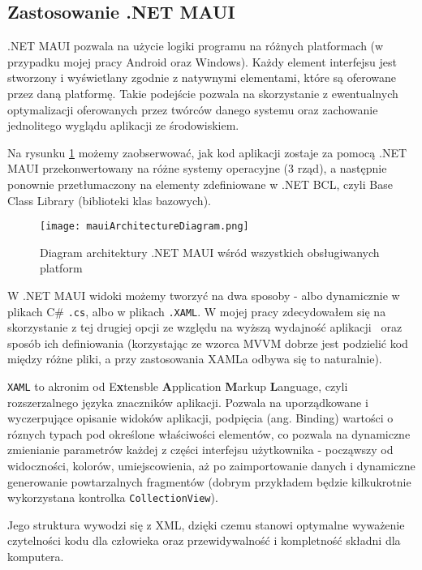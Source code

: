 \subsection{Zastosowanie .NET MAUI}

.NET MAUI pozwala na użycie logiki programu na różnych platformach 
(w przypadku mojej pracy Android oraz Windows).
Każdy element interfejsu jest stworzony i wyświetlany zgodnie z natywnymi elementami, 
które są oferowane przez daną platformę. Takie podejście pozwala na skorzystanie 
z ewentualnych optymalizacji oferowanych przez twórców danego systemu oraz 
zachowanie jednolitego wyglądu aplikacji ze środowiskiem.

Na rysunku \ref{img:mauiArchitectureDiagram} możemy zaobserwować, jak kod aplikacji 
zostaje za pomocą .NET MAUI przekonwertowany na różne systemy operacyjne (3 rząd), 
a następnie ponownie przetłumaczony na elementy zdefiniowane w .NET BCL, 
czyli Base Class Library (biblioteki klas bazowych). \\%
\begin{figure}[ht]
    \centering
    \texttt{[image: mauiArchitectureDiagram.png]}
    \caption{Diagram architektury .NET MAUI wśród wszystkich obsługiwanych platform \cite{mauiDefinition}}
    \label{img:mauiArchitectureDiagram}
\end{figure}

W .NET MAUI widoki możemy tworzyć na dwa sposoby - albo dynamicznie w plikach C\# \verb|.cs|, 
albo w plikach \verb|.XAML|. W mojej pracy zdecydowałem się na skorzystanie z tej drugiej opcji 
ze względu na wyższą wydajność aplikacji~\cite{xamlPerformance} oraz sposób ich definiowania 
(korzystając ze wzorca MVVM dobrze jest podzielić kod między różne pliki, 
a przy zastosowania XAMLa odbywa się to naturalnie).

\verb|XAML| to akronim od E\textbf{x}tensble \textbf{A}pplication \textbf{M}arkup \textbf{L}anguage, 
czyli rozszerzalnego języka znaczników aplikacji. Pozwala na uporządkowane i wyczerpujące opisanie 
widoków aplikacji, podpięcia (ang. Binding) wartości o róznych typach pod określone właściwości 
elementów, co pozwala na dynamiczne zmienianie parametrów każdej z części interfejsu użytkownika - 
począwszy od widoczności, kolorów, umiejscowienia, aż po zaimportowanie danych i dynamiczne generowanie 
powtarzalnych fragmentów (dobrym przykładem będzie kilkukrotnie wykorzystana kontrolka \verb|CollectionView|).

Jego struktura wywodzi się z XML, dzięki czemu stanowi optymalne wyważenie czytelności kodu dla człowieka 
oraz przewidywalność i kompletność składni dla komputera.


